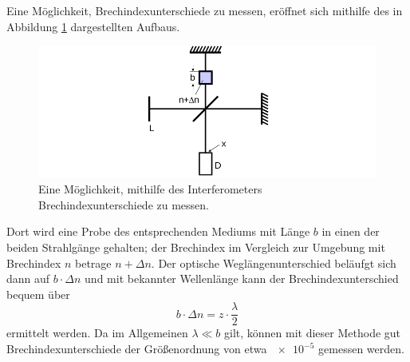 Eine Möglichkeit, Brechindexunterschiede zu messen, eröffnet sich mithilfe des in Abbildung \ref{fig:Brechindex_messen} 
dargestellten Aufbaus. 
\begin{figure}
    \centering
    \includegraphics[width=\textwidth]{plots/Brechindex_messen.png}
    \caption{Eine Möglichkeit, mithilfe des Interferometers Brechindexunterschiede zu messen\cite{Versuchsanleitung}.}
    \label{fig:Brechindex_messen}
\end{figure}
Dort wird eine Probe des entsprechenden Mediums mit Länge $b$ in einen der beiden Strahlgänge gehalten; der Brechindex 
im Vergleich zur Umgebung mit Brechindex $n$ betrage $n+\Delta n$.
Der optische Weglängenunterschied beläufgt sich dann auf $b\cdot \Delta n$ und mit bekannter Wellenlänge kann der Brechindexunterschied 
bequem über 
\begin{equation}
    b\cdot \Delta n=z\cdot \frac{\lambda}{2}
    \label{eqn:b}
\end{equation}
ermittelt werden. 
Da im Allgemeinen $\lambda \ll b$ gilt, können mit dieser Methode gut Brechindexunterschiede der Größenordnung von etwa $\num{e-5}$ gemessen werden\cite{Versuchsanleitung}. 
